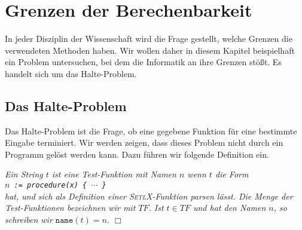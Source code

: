 \chapter{Grenzen der Berechenbarkeit}
In jeder Disziplin der Wissenschaft wird die Frage gestellt, welche Grenzen die
verwendeten Methoden haben.   Wir wollen daher in diesem Kapitel beispielhaft ein Problem
untersuchen, bei dem die Informatik an ihre Grenzen st\"o{\ss}t.  Es handelt sich um das Halte-Problem. 

\section{Das Halte-Problem}
Das Halte-Problem ist die Frage, ob eine gegebene Funktion f\"ur eine bestimmte Eingabe
terminiert.  Wir werden zeigen, dass dieses Problem nicht durch ein Programm gel\"ost werden
kann.  Dazu f\"uhren wir folgende Definition ein.

\begin{Definition} 
{\em Ein String $t$ ist eine \emph{Test-Funktion} mit Namen $n$ wenn $t$ 
 die Form \\[0.3cm]
\hspace*{1.3cm} {\tt $n$ := procedure(x) \{ $\cdots$ \}} \\[0.3cm]
hat, und sich als Definition einer \textsc{SetlX}-Funktion parsen l\"asst.  Die Menge der
Test-Funktionen bezeichnen wir mit $T\!F$.  Ist $t \in T\!F$ und hat den Namen $n$, so
schreiben wir $\mathtt{name}(t) = n$.} \hspace*{\fill} $\Box$
\end{Definition}

